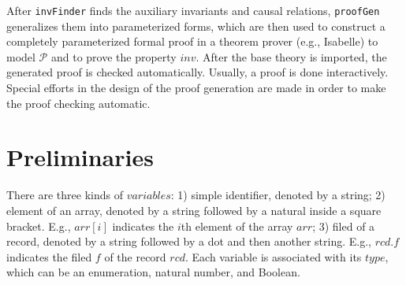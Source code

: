 \documentclass[conference]{IEEEtran}
\begin{document}
After {\tt invFinder} finds the auxiliary invariants and causal relations, {\tt proofGen} generalizes them  into  parameterized forms, which are then used to construct a completely parameterized formal proof in a theorem prover (e.g., Isabelle) to model $\mathcal{P}$ and to prove the property $inv$. After the base theory is imported, the generated proof is checked automatically.  Usually, a proof is done interactively. Special efforts in the design of the proof generation are made in order to make the proof checking automatic. %

\vspace{-0.5cm}
\section{Preliminaries}\label{sec:Preliminaries}
\vspace{-0.3cm}
There are three kinds of $variables$:
1) simple identifier, denoted by a string;
2) element of an array, denoted by a string followed by a natural inside a square bracket. E.g., $arr[i]$ indicates the $i$th element of the array $arr$;
3) filed of a record, denoted by a string followed by a dot and then another string. E.g., $rcd.f$ indicates the filed $f$ of the record $rcd$.
Each variable is associated with its $type$, which can be an enumeration, natural number, and Boolean.

\end{document}
